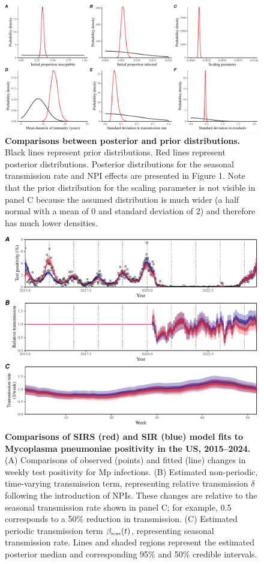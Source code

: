 \documentclass[12pt]{article}
\newcommand{\tsub}[2]{#1_{{\textrm{\tiny #2}}}}
\begin{document}
\pagebreak

\begin{figure}[!ht]
\includegraphics[width=\textwidth]{../figure1/figure1_posterior.pdf}
\caption{
\textbf{Comparisons between posterior and prior distributions.}
Black lines represent prior distributions.
Red lines represent posterior distributions.
Posterior distributions for the seasonal transmission rate and NPI effects are presented in Figure 1.
Note that the prior distribution for the scaling parameter is not visible in panel C because the assumed distribution is much wider (a half normal with a mean of 0 and standard deviation of 2) and therefore has much lower densities.
}
\end{figure}

\pagebreak

\begin{figure}[!ht]
\includegraphics[width=\textwidth]{../figure_sirs/figure_sirs_fit.pdf}
\caption{
\textbf{Comparisons of SIRS (red) and SIR (blue) model fits to Mycoplasma pneumoniae positivity in the US, 2015--2024.}
(A) Comparisons of observed (points) and fitted (line) changes in weekly test positivity for Mp infections.
(B) Estimated non-periodic, time-varying transmission term, representing relative transmission $\delta$ following the introduction of NPIs.
These changes are relative to the seasonal transmission rate shown in panel C;
for example, 0.5 corresponds to a 50\% reduction in transmission.
(C) Estimated periodic transmission term  $\tsub{\beta}{seas}(t)$, representing seasonal transmission rate.
Lines and shaded regions represent the estimated posterior median and corresponding 95\% and 50\% credible intervals.
}
\end{figure}
\end{document}
